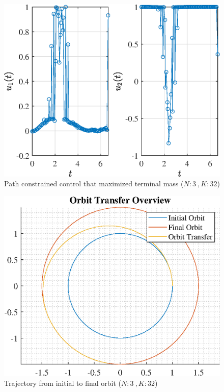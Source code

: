 \documentclass[]{article}
\begin{document}
\begin{figure}
	\centering
	\includegraphics[scale=0.75]{path_N3_K32_C3_mf.eps}
	\caption{Path constrained control that maximized terminal mass (\(N:3\ , K:32\))}
	\label{fig:path_N3_K32_C3_mf}
\end{figure}
\begin{figure}
	\centering
	\includegraphics[scale=0.75]{orbit_N3_K32_C3_mf.eps}
	\caption{Trajectory from initial to final orbit (\(N:3\ , K:32\))}
	\label{fig:orbit_N3_K32_C3_mf}
\end{figure}
\end{document}
